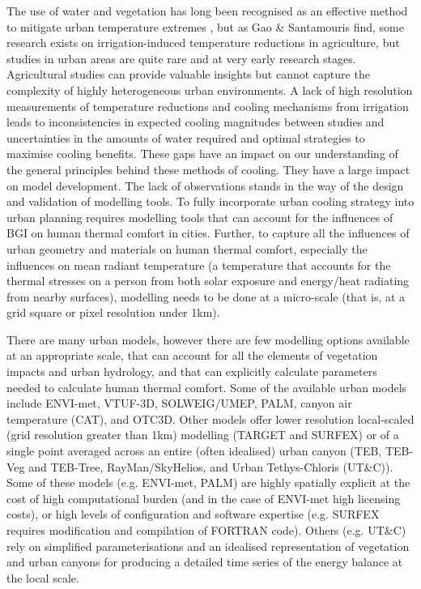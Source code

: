 The use of water and vegetation has long been recognised as an effective method to mitigate urban temperature extremes \cite{Coutts2012,Bowler2010}, but as Gao \& Santamouris \cite{Gao2019} find, some research exists on irrigation-induced temperature reductions in agriculture, but studies in urban areas are quite rare and at very early research stages. Agricultural studies can provide valuable insights but cannot capture the complexity of highly heterogeneous urban environments. A lack of high resolution measurements of temperature reductions and cooling mechanisms from irrigation leads to inconsistencies in expected cooling magnitudes between studies and uncertainties in the amounts of water required and optimal strategies to maximise cooling benefits. These gaps have an impact on our understanding of the general principles behind these methods of cooling. They have a large impact on model development. The lack of observations stands in the way of the design and validation of modelling tools. To fully incorporate urban cooling strategy into urban planning requires modelling tools that can account for the influences of BGI on human thermal comfort in cities. Further, to capture all the influences of urban geometry and materials on human thermal comfort, especially the influences on mean radiant temperature\cite{Kantor2011} (a temperature that accounts for the thermal stresses on a person from both solar exposure and energy/heat radiating from nearby surfaces), modelling needs to be done at a micro-scale (that is, at a grid square or pixel resolution under 1km). 

There are many urban models, however there are few modelling options available at an appropriate scale, that can account for all the elements of vegetation impacts and urban hydrology, and that can explicitly calculate parameters needed to calculate human thermal comfort. Some of the available urban models include ENVI-met\cite{Bruse1999}, VTUF-3D\cite{Nice2018a}, SOLWEIG/UMEP\cite{Lindberg2018}, PALM\cite{Dominik2019}, canyon air temperature (CAT)\cite{Erell2006}, and OTC3D\cite{Nazarian2018}. Other models offer lower resolution local-scaled (grid resolution greater than 1km) modelling (TARGET\cite{Broadbent2019c} and SURFEX\cite{Masson2013}) or of a single point averaged across an entire (often idealised) urban canyon (TEB\cite{Masson2002a},  TEB-Veg and TEB-Tree\cite{Lemonsu2012,Redon2020}, RayMan\cite{Matzarakis2010}/SkyHelios\cite{Matzarakis2011}, and Urban Tethys-Chloris (UT\&C)\cite{Meili2020}). Some of these models (e.g. ENVI-met, PALM) are highly spatially explicit at the cost of high computational burden (and in the case of ENVI-met high licensing costs), or high levels of configuration and software expertise (e.g. SURFEX requires modification and compilation of FORTRAN code). Others (e.g. UT\&C) rely on simplified parameterisations and an idealised representation of vegetation and urban canyons for producing a detailed time series of the energy balance at the local scale. 

